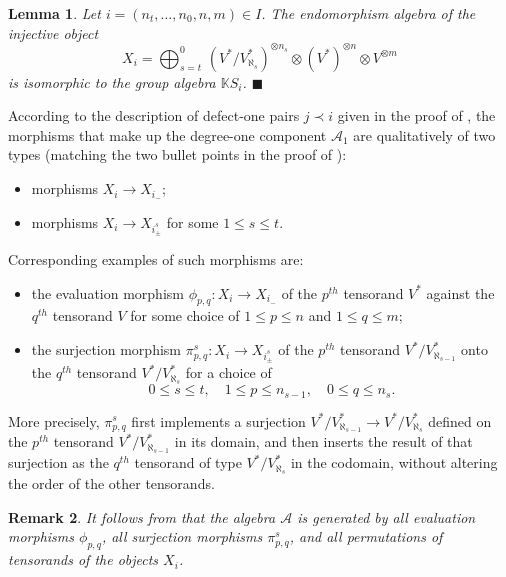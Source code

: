 \documentclass[11pt]{article}
\theoremstyle{plain}
\newtheorem{lemma}{Lemma}[section]
\theoremstyle{nonumberplain}
\theoremstyle{plain}
\newtheorem{remark}[lemma]{Remark}
\theoremstyle{nonumberplain}
\newcommand\bK{\mathbb K}
\newcommand\cA{\mathcal A}
\newcommand\al{\aleph}
\newcommand{\qedhere}{\mbox{}\hfill\ensuremath{\blacksquare}}
\begin{document}
\begin{lemma}\label{le.deg-0}
  Let $i=\left(n_t,\ldots,n_0,n,m\right)\in I$. The endomorphism algebra of the injective
  object 
  $$X_i=\bigoplus_{s=t}^0 \,\left(V^*/V^*_{\aleph_s}\right)^{\otimes n_s} \otimes \left(V^*\right)^{\otimes n}\otimes V^{\otimes m}$$ is isomorphic to the group algebra $\bK S_i$.  \qedhere
\end{lemma}




 According to the
description of defect-one pairs $j\prec i$ given in the proof of ,
the morphisms that make up the degree-one component $\cA_1$ are
qualitatively of two types (matching the two bullet points in the proof of
):

\begin{itemize}
  \item morphisms $X_i\to X_{i_-}$;
  \item morphisms $X_i\to X_{i^s_{\pm}}$ for some $1\le s\le t$.
\end{itemize}








Corresponding examples of such morphisms are:
\begin{itemize}
\item the evaluation morphism $\phi_{p,q}:X_i\to X_{i_-}$ of the
  $p^{th}$ tensorand  $V^*$  against the $q^{th}$ tensorand $V$ for
  some choice of $1\le p\le n$ and $1\le q\le m$;
\item the surjection morphism $\pi^s_{p,q}:X_i\to X_{i^s_{\pm}}$ of the
  $p^{th}$  tensorand $V^*/V^*_{\al_{s-1}}$ onto the $q^{th}$ tensorand
  $V^*/V^*_{\al_{s}}$ for a choice of
  \begin{equation*}
    0\le s\le t,\quad 1\le p\le n_{s-1},\quad 0\le q\le n_{s}. 
  \end{equation*}
\end{itemize}
More precisely, $\pi^s_{p,q}$ first implements a surjection
$V^*/V^*_{\al_{s-1}}\to V^*/V^*_{\al_{s}}$ defined on the $p^{th}$
tensorand $V^*/V^*_{\al_{s-1}}$ in its domain, and then inserts the
result of that surjection as the $q^{th}$ tensorand of type
$V^*/V^*_{\al_{s}}$ in the codomain, without altering the order of the
other tensorands.


\begin{remark}\label{re.full}
  It follows from \cite[Lemma 2.19]{us2} that the algebra $\mathcal{A}$ is generated by all evaluation morphisms $\phi_{p,q}$, all surjection morphisms $\pi^s_{p,q}$, and all permutations of tensorands of the objects $X_i$.
\end{remark}
\end{document}
